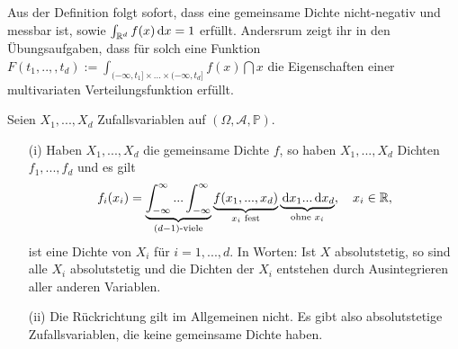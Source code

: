 Aus der Definition folgt sofort, dass eine gemeinsame Dichte nicht-negativ und messbar ist, sowie $\int_{\mathbb{R}^d} f(x)\, \mathrm{d} x=1$ erf\"ullt. Andersrum zeigt ihr in den \"Ubungsaufgaben, dass f\"ur solch eine Funktion $F(t_1,..,,t_d):=\int_{(-\infty, t_1]\times ... \times(-\infty, t_d]} f(x)\dint x$ die Eigenschaften einer multivariaten Verteilungsfunktion erf\"ullt.\smallskip


\begin{prop}\label{p4}
	Seien $X_1,...,X_d$ Zufallsvariablen auf $(\Omega,\mathcal A, \mathbb P)$.
	\begin{itemize}
	\item[(i)] Haben $X_1,...,X_d$ die gemeinsame Dichte $f$, so haben $X_1,...,X_d$ Dichten $f_1,...,f_d$ und es gilt \[ f_i(x_i) = \underbrace{\int_{-\infty}^{\infty} ... \int_{-\infty}^{\infty}}_{(d-1)\text{-viele}} \underbrace{f(x_1,...,x_d)}_{x_i \text{ fest}} \underbrace{\, \mathrm{d} x_1 ... \, \mathrm{d} x_d}_{\text{ohne } x_i}, \quad x_i \in\mathbb{R}, \] ist eine Dichte von $X_i$ für $i=1,...,d$. In Worten: Ist $X$ absolutstetig, so sind alle $X_i$ absolutstetig und die Dichten der $X_i$ entstehen durch Ausintegrieren aller anderen Variablen.
	\item[(ii)] Die R\"uckrichtung gilt im Allgemeinen nicht. Es gibt also absolutstetige Zufallsvariablen, die keine gemeinsame Dichte haben.
\end{itemize}
\end{prop}

